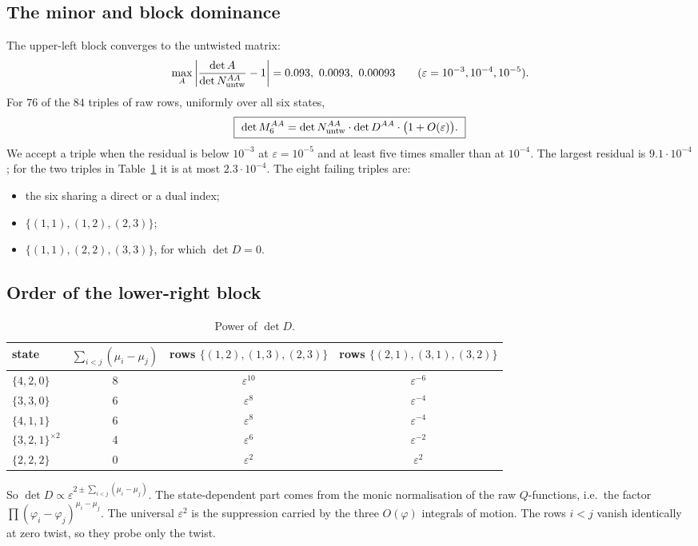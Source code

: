 \documentclass[11pt]{article}
\begin{document}
\subsection{The minor and block dominance}
The upper-left block converges to the untwisted matrix:
\begin{equation}
\max_A\left|\frac{\det A}{\det N^{AA}_{\rm untw}}-1\right|=0.093,\ 0.0093,\ 0.00093
\qquad(\varepsilon=10^{-3},10^{-4},10^{-5}).
\end{equation}
For $76$ of the $84$ triples of raw rows, uniformly over all six states,
\begin{equation}
\boxed{\ \det M_6^{AA}=\det N^{AA}_{\rm untw}\cdot\det D^{AA}\cdot\big(1+O(\varepsilon)\big).\ }
\end{equation}
We accept a triple when the residual is below $10^{-3}$ at $\varepsilon=10^{-5}$ and at least five
times smaller than at $10^{-4}$. The largest residual is $9.1\cdot10^{-4}$; for the two triples in
Table~\ref{tab:pow} it is at most $2.3\cdot10^{-4}$. The eight failing triples are:
\begin{itemize}
\item the six sharing a direct or a dual index;
\item $\{(1,1),(1,2),(2,3)\}$;
\item $\{(1,1),(2,2),(3,3)\}$, for which $\det D=0$.
\end{itemize}

\subsection{Order of the lower-right block}
\begin{table}[h]
\centering
\begin{tabular}{lccc}
\toprule
state & $\sum_{i<j}(\mu_i-\mu_j)$ & rows $\{(1,2),(1,3),(2,3)\}$ & rows $\{(2,1),(3,1),(3,2)\}$\\
\midrule
$\{4,2,0\}$ & 8 & $\varepsilon^{10}$ & $\varepsilon^{-6}$\\
$\{3,3,0\}$ & 6 & $\varepsilon^{8}$ & $\varepsilon^{-4}$\\
$\{4,1,1\}$ & 6 & $\varepsilon^{8}$ & $\varepsilon^{-4}$\\
$\{3,2,1\}^{\times2}$ & 4 & $\varepsilon^{6}$ & $\varepsilon^{-2}$\\
$\{2,2,2\}$ & 0 & $\varepsilon^{2}$ & $\varepsilon^{2}$\\
\bottomrule
\end{tabular}
\caption{Power of $\det D$.}
\label{tab:pow}
\end{table}
So $\det D\propto\varepsilon^{2\pm\sum_{i<j}(\mu_i-\mu_j)}$. The state-dependent part comes from the
monic normalisation of the raw $Q$-functions, i.e.\ the factor $\prod(\varphi_i-\varphi_j)^{\mu_i-\mu_j}$.
The universal $\varepsilon^2$ is the suppression carried by the three $O(\varphi)$ integrals of
motion. The rows $i<j$ vanish identically at zero twist, so they probe only the twist.
\end{document}
